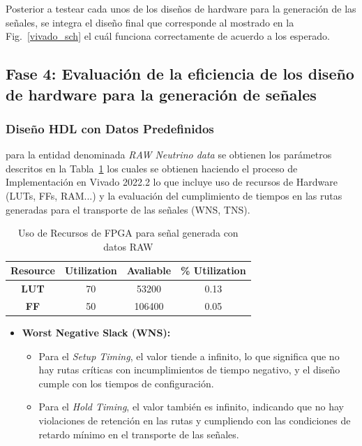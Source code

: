 \documentclass[conference]{IEEEtran}
\begin{document}
{Posterior a testear cada unos de los diseños de hardware para la generación de las señales, se integra el diseño final que corresponde al mostrado en la Fig.~\ref{vivado_sch} el cuál funciona correctamente de acuerdo a los esperado.

\subsection{Fase 4: Evaluación de la eficiencia de los diseño de hardware para la generación de señales}
\subsubsection{Diseño HDL con Datos Predefinidos}
para la entidad denominada \textit{RAW Neutrino data} se obtienen los parámetros descritos en la Tabla~\ref{predefined data evaluation} los cuales se obtienen haciendo el proceso de Implementación en Vivado 2022.2 lo que incluye uso de recursos de Hardware (LUTs, FFs, RAM...) y la evaluación del cumplimiento de tiempos en las rutas generadas para el transporte de las señales (WNS, TNS).




\begin{table}[H]
\caption{Uso de Recursos de FPGA para señal generada con datos RAW}
\begin{center}
\begin{tabular}{|c|c|c|c|}
\hline
\textbf{Resource} & \textbf{Utilization} & \textbf{Avaliable} & \textbf{\% Utilization} \\
\hline
\textbf{LUT} & 70 & 53200 & 0.13 \\
\hline
\textbf{FF} & 50 & 106400 & 0.05 \\
\hline
\end{tabular}
\label{predefined data evaluation}
\end{center}
\end{table}

\begin{itemize}
  \item \textbf{Worst Negative Slack (WNS):}
    \begin{itemize}
        \item Para el \textit{Setup Timing}, el valor tiende a infinito, lo que significa que no hay rutas críticas con incumplimientos de tiempo negativo, y el diseño cumple con los tiempos de configuración.
        \item Para el \textit{Hold Timing}, el valor también es infinito, indicando que no hay violaciones de retención en las rutas y cumpliendo con las condiciones de retardo mínimo en el transporte de las señales.
    \end{itemize}
    

\end{itemize}}
\end{document}

